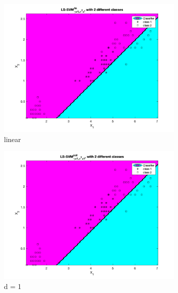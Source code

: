 \documentclass[a4paper, 11pt, one column]{article}
\begin{document}
\begin{figure}[]

        \begin{subfigure}{0.33\linewidth}
            \includegraphics[width=\linewidth]{images/lssvm_lin.png}
            \caption{linear}
        \end{subfigure}
        \begin{subfigure}{0.33\linewidth}
            \includegraphics[width=\linewidth]{images/lssvm_poly_deg1.png}
            \caption{d = 1}
        \end{subfigure}
        \begin{subfigure}{0.33\linewidth}

\end{subfigure}
\end{figure}
\end{document}
